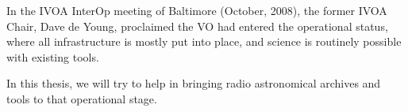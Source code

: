		
		In the IVOA InterOp meeting of Baltimore (October, 2008),
		the former IVOA Chair, Dave de Young, proclaimed the VO
		had entered the operational status, where all infrastructure
		is mostly put into place, and science is routinely possible
		with existing tools.
		
		In this thesis, we will try to help in bringing radio
		astronomical archives and tools to that operational stage.
		
	
	
	
%
%		
%			
%


